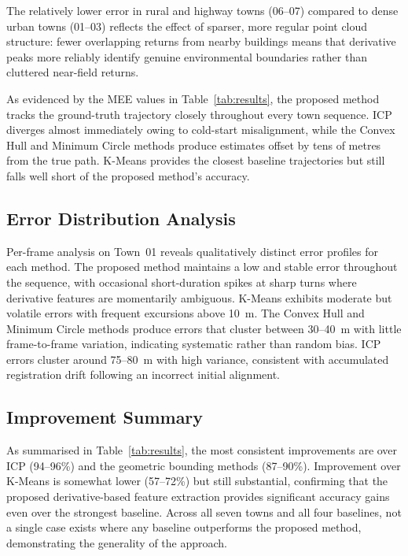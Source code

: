\documentclass[lettersize,journal]{IEEEtran}
\begin{document}
The relatively lower error in rural and highway towns (06--07) compared to
dense urban towns (01--03) reflects the effect of sparser, more regular
point cloud structure: fewer overlapping returns from nearby buildings means
that derivative peaks more reliably identify genuine environmental boundaries
rather than cluttered near-field returns.

As evidenced by the MEE values in Table~\ref{tab:results}, the proposed method
tracks the ground-truth trajectory closely throughout every town sequence.
ICP diverges almost immediately owing to cold-start misalignment, while the
Convex Hull and Minimum Circle methods produce estimates offset by tens of
metres from the true path. K-Means provides the closest baseline trajectories
but still falls well short of the proposed method's accuracy.

\subsection{Error Distribution Analysis}

Per-frame analysis on Town~01 reveals qualitatively distinct error profiles
for each method. The proposed method maintains a low and stable error
throughout the sequence, with occasional short-duration spikes at sharp turns
where derivative features are momentarily ambiguous. K-Means exhibits moderate
but volatile errors with frequent excursions above 10~m. The Convex Hull and
Minimum Circle methods produce errors that cluster between 30--40~m with
little frame-to-frame variation, indicating systematic rather than random
bias. ICP errors cluster around 75--80~m with high variance, consistent with
accumulated registration drift following an incorrect initial alignment.

\subsection{Improvement Summary}

As summarised in Table~\ref{tab:results}, the most consistent improvements
are over ICP (94--96\%) and the geometric bounding methods (87--90\%).
Improvement over K-Means is somewhat lower (57--72\%) but still substantial,
confirming that the proposed derivative-based feature extraction provides
significant accuracy gains even over the strongest baseline. Across all
seven towns and all four baselines, not a single case exists where any
baseline outperforms the proposed method, demonstrating the generality of
the approach.
\end{document}
